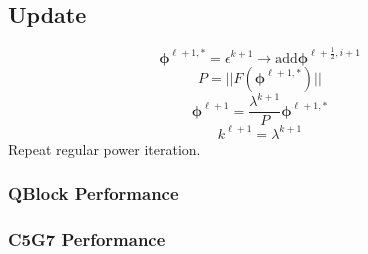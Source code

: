 \documentclass[11pt,letterpaper,notitlepage]{article}
\numberwithin{equation}{section}
\newcommand{\bphi}{\boldsymbol{\phi}}
\newcommand{\half}{\frac{1}{2}}
\begin{document}
\subsection{Update}
$$
\bphi^{\ell+1,*} = \epsilon^{k+1} \to \text{add} \bphi^{\ell+\half, i+1}
$$
$$
P = || F(\bphi^{\ell+1,*}) ||
$$
$$
\bphi^{\ell+1} = \frac{\lambda^{k+1}}{P} \bphi^{\ell+1,*}
$$
$$
k^{\ell+1} = \lambda^{k+1}
$$
Repeat regular power iteration.

\subsubsection{QBlock Performance}

\subsubsection{C5G7 Performance}
\end{document}
